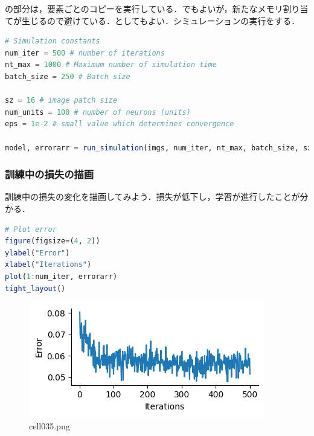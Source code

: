 の部分は，要素ごとのコピーを実行している．でもよいが，新たなメモリ割り当てが生じるので避けている．としてもよい．シミュレーションの実行をする．
\begin{lstlisting}[language=julia]
# Simulation constants
num_iter = 500 # number of iterations
nt_max = 1000 # Maximum number of simulation time
batch_size = 250 # Batch size

sz = 16 # image patch size
num_units = 100 # number of neurons (units)
eps = 1e-2 # small value which determines convergence

model, errorarr = run_simulation(imgs, num_iter, nt_max, batch_size, sz, num_units, eps);
\end{lstlisting}
\subsubsection{訓練中の損失の描画}
訓練中の損失の変化を描画してみよう．損失が低下し，学習が進行したことが分かる．
\begin{lstlisting}[language=julia]
# Plot error
figure(figsize=(4, 2))
ylabel("Error")
xlabel("Iterations")
plot(1:num_iter, errorarr)
tight_layout()
\end{lstlisting}
\begin{figure}[ht]
	\centering
	\includegraphics[scale=0.8, max width=\linewidth]{./fig/energy-based-model/sparse-coding/cell035.png}
	\caption{cell035.png}
	\label{cell035.png}
\end{figure}
